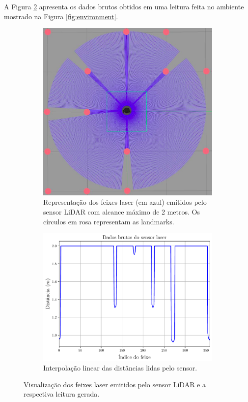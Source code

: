 A Figura \ref{fig:sensor-raw-data} apresenta os dados brutos obtidos em uma 
leitura feita no ambiente mostrado na Figura \ref{fig:environment}.
\begin{figure}[h]
  \centering
  \begin{subfigure}{0.6\textwidth}
    \includegraphics[width=\textwidth, angle=90]{figs/sensor-simulation-view.png}
    \caption{Representação dos feixes laser (em azul) emitidos pelo sensor LiDAR com 
    alcance máximo de 2 metros. Os círculos em rosa representam as landmarks.}
    \label{fig:laser-beams-visualization}
  \end{subfigure}
  \begin{subfigure}{0.8\textwidth}
    \includegraphics[width=\textwidth]{figs/raw_sensor_data.pdf}
    \caption{Interpolação linear das distâncias lidas pelo sensor.}
    \label{fig:sensor-raw-data}
  \end{subfigure}
  \caption{Visualização dos feixes laser emitidos pelo sensor LiDAR e a 
  respectiva leitura gerada.}
  \label{fig:sensor-visualization-and-reading}
\end{figure}

